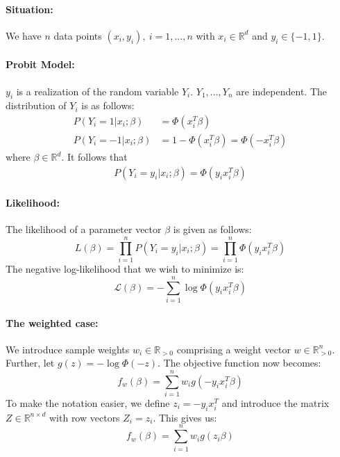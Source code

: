 \paragraph{Situation:}
We have $n$ data points $(x_i, y_i), \ i=1,...,n$ with
$x_i \in \mathbb{R}^d$ and $y_i \in \{ -1, 1\}$.

\paragraph{Probit Model:}
$y_i$ is a realization of the random variable $Y_i$.
$Y_1, ..., Y_n$ are independent.
The distribution of $Y_i$ is as follows:
\begin{align*}
    P(Y_i = 1 | x_i; \beta)  & = \Phi(x_i^T \beta)                          \\
    P(Y_i = -1 | x_i; \beta) & = 1 - \Phi(x_i^T \beta) = \Phi(-x_i^T \beta)
\end{align*}
where $\beta \in \mathbb{R}^d$.
It follows that
\begin{align*}
    P(Y_i = y_i | x_i; \beta) = \Phi(y_i x_i^T \beta)
\end{align*}

\paragraph{Likelihood:}
The likelihood of a parameter vector $\beta$ is given as follows:
\begin{equation*}
    L(\beta) = \prod_{i=1}^n P(Y_i = y_i | x_i; \beta) = \prod_{i=1}^n \Phi(y_i x_i^T \beta)
\end{equation*}
The negative log-likelihood that we wish to minimize is:
\begin{equation*}
    \mathcal{L}(\beta) = -\sum_{i=1}^n \log \Phi(y_i x_i^T \beta)
\end{equation*}

\paragraph{The weighted case:}
We introduce sample weights $w_i \in \mathbb{R}_{>0}$
comprising a weight vector $w \in \mathbb{R}_{>0}^n$.
Further, let $g(z) = -\log \Phi(-z)$.
The objective function now becomes:
\begin{equation*}
    f_w(\beta) = \sum_{i=1}^n w_i g(-y_i x_i^T \beta)
\end{equation*}
To make the notation easier, we define $z_i = -y_i x_i^T$ and introduce
the matrix $Z \in \mathbb{R}^{n \times d}$ with row vectors $Z_i = z_i$.
This gives us:
\begin{equation*}
    f_w(\beta) = \sum_{i=1}^n w_i g(z_i \beta)
\end{equation*}

